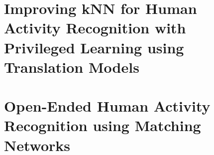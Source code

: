\documentclass[runningheads]{llncs}
\begin{document}
\clearpage




\begin{appendices}
\section{Improving kNN for Human Activity Recognition with Privileged Learning using Translation Models}
\label{apndx:translators}


\section{Open-Ended Human Activity Recognition using Matching Networks}
\label{apndx:openendedhar}



\end{appendices}
\end{document}
